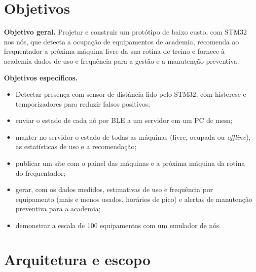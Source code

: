 \documentclass[11pt,a4paper]{article}
\begin{document}
\section{Objetivos}

\textbf{Objetivo geral.} Projetar e construir um protótipo de baixo custo, com
STM32 nos nós, que detecta a ocupação de equipamentos de academia, recomenda
ao frequentador a próxima máquina livre da sua rotina de treino e fornece à
academia dados de uso e frequência para a gestão e a manutenção preventiva.

\noindent\textbf{Objetivos específicos.}
\begin{itemize}
  \item Detectar presença com sensor de distância lido pelo STM32, com
        histerese e temporizadores para reduzir falsos positivos;
  \item enviar o estado de cada nó por BLE a um servidor em um PC de mesa;
  \item manter no servidor o estado de todas as máquinas (livre, ocupada ou
        \emph{offline}), as estatísticas de uso e a recomendação;
  \item publicar um site com o painel das máquinas e a próxima máquina da
        rotina do frequentador;
  \item gerar, com os dados medidos, estimativas de uso e frequência por
        equipamento (mais e menos usados, horários de pico) e alertas de
        manutenção preventiva para a academia;
  \item demonstrar a escala de 100 equipamentos com um emulador de nós.
\end{itemize}

\section{Arquitetura e escopo}
\end{document}
